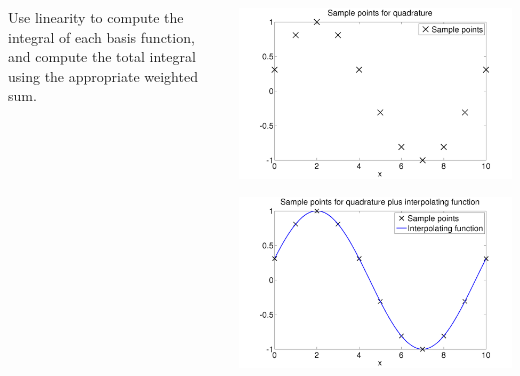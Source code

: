 \documentclass{beamer}
\begin{document}
\begin{frame}
\begin{columns}
\begin{column}{0.5\textwidth}
\begin{overlayarea}{\textwidth}{0.6\textheight}
{          Use linearity to compute the integral of each
          basis function, and compute the total integral using the
          appropriate weighted sum.
        }
      \end{overlayarea}
    \end{column}
    \begin{column}{0.5\textwidth}
      \begin{overlayarea}{\textwidth}{0.6\textheight}
        {
          \begin{center}
            \includegraphics[width=\textwidth]{figures/QuadAliasing1}
          \end{center}
        }
        {
          \begin{center}
            \includegraphics[width=\textwidth]{figures/QuadAliasing2}
          \end{center}
        }
        {
          \begin{center}

\end{center}}
\end{overlayarea}
\end{column}
\end{columns}
\end{frame}
\end{document}
